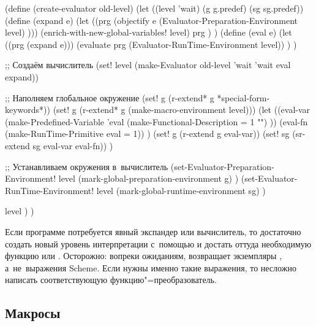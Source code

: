 
\begin{code:lisp}
(define (create-evaluator old-level)
  (let ((level 'wait)
        (g     g.predef)
        (sg    sg.predef))
    (define (expand e)
      (let ((prg (objectify
                  e (Evaluator-Preparation-Environment level) )))
        (enrich-with-new-global-variables! level)
        prg ) )
    (define (eval e)
      (let ((prg (expand e)))
        (evaluate prg (Evaluator-RunTime-Environment level)) ) )

  ;; Создаём вычислитель
    (set! level (make-Evaluator old-level 'wait 'wait eval expand))

  ;; Наполняем глобальное окружение
    (set! g (r-extend* g *special-form-keywords*))
    (set! g (r-extend* g (make-macro-environment level)))
    (let ((eval-var (make-Predefined-Variable
                     'eval (make-Functional-Description = 1 "") ))
          (eval-fn (make-RunTime-Primitive eval = 1)) )
      (set! g (r-extend g eval-var))
      (set! sg (sr-extend sg eval-var eval-fn)) )

  ;; Устанавливаем окружения в~вычислитель
    (set-Evaluator-Preparation-Environment!
     level (mark-global-preparation-environment g) )
    (set-Evaluator-RunTime-Environment!
     level (mark-global-runtime-environment sg) )
    
    level ) )
\end{code:lisp}

Если программе потребуется явный экспандер или вычислитель, то достаточно
создать новый уровень интерпретации с~помощью  и достать
оттуда необходимую функцию  или . Ос\-то\-рожно: вопреки
ожиданиям,  возвращает экземпляры , а~не~выражения
Scheme. Если нужны именно такие выражения, то несложно написать соответствующую
функцию"=преобразователь. 


\subsection{Макросы}\label{macros/macrosystem/ssect:macros}

